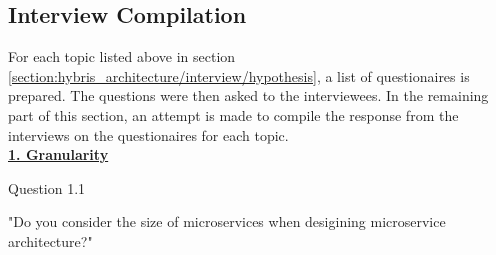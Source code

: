 \subsection{Interview Compilation}\label{section:hybris_architecture/interview/interview_compilation}
For each topic listed above in section \ref{section:hybris_architecture/interview/hypothesis}, a list of questionaires is prepared. The questions were then asked to the interviewees. In the remaining part of this section, an attempt is made to compile the response from the interviews on the questionaires for each topic.
\\
\textbf{\underline{1. Granularity}}\\  
\begin{shaded} Question 1.1 \end{shaded} \label{question:hybris_architecture/interview/question_1.1}
"Do you consider the size of microservices when desigining microservice architecture?"\\

\\
\\

